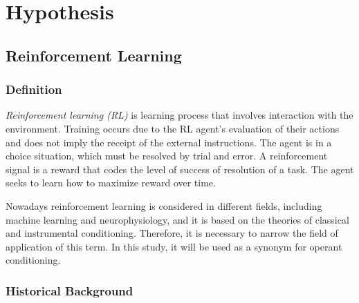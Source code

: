 \documentclass[14pt,a4paper]{scrartcl}
\begin{document}
\section{Hypothesis}
\label{sec:Hypothesis}

\subsection{Reinforcement Learning}
\label{sec:Hypothesis:Reinforcement Learning}

\subsubsection{Definition}
\label{sec:Hypothesis:Learning Process:Definition}

\textit{Reinforcement learning (RL)} is learning process that involves interaction with the environment. Training occurs due to the RL agent's evaluation of their actions and does not imply the receipt of the external instructions. The agent is in a choice situation, which must be resolved by trial and error. A reinforcement signal is a reward that codes the level of success of resolution of a task. The agent seeks to learn how to maximize reward over time. 

Nowadays reinforcement learning is considered in different fields, including machine learning and neurophysiology, and it is based on the theories of classical and instrumental conditioning. Therefore, it is necessary to narrow the field of application of this term. In this study, it will be used as a synonym for operant conditioning. 

\subsubsection{Historical Background}
\label{sec:Hypothesis:Learning Process:Historical Background}
\end{document}
